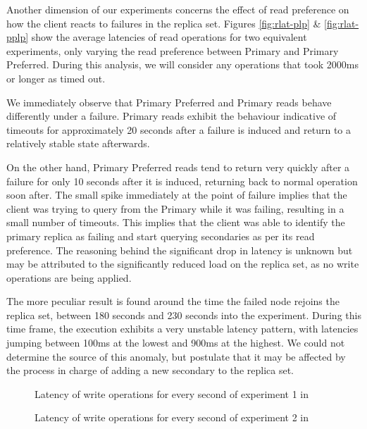 Another dimension of our experiments concerns the effect of read preference on how the client reacts to failures in the replica set. Figures \ref{fig:rlat-plp} \& \ref{fig:rlat-pplp} show the average latencies of read operations for two equivalent experiments, only varying the read preference between Primary and Primary Preferred. During this analysis, we will consider any operations that took 2000ms or longer as timed out.

We immediately observe that Primary Preferred and Primary reads behave differently under a failure. Primary reads exhibit the behaviour indicative of timeouts for approximately 20 seconds after a failure is induced and return to a relatively stable state afterwards.

On the other hand, Primary Preferred reads tend to return very quickly after a failure for only 10 seconds after it is induced, returning back to normal operation soon after. The small spike immediately at the point of failure implies that the client was trying to query from the Primary while it was failing, resulting in a small number of timeouts. This implies that the client was able to identify the primary replica as failing and start querying secondaries as per its read preference. The reasoning behind the significant drop in latency is unknown but may be attributed to the significantly reduced load on the replica set, as no write operations are being applied.

The more peculiar result is found around the time the failed node rejoins the replica set, between 180 seconds and 230 seconds into the experiment. During this time frame, the execution exhibits a very unstable latency pattern, with latencies jumping between 100ms at the lowest and 900ms at the highest. We could not determine the source of this anomaly, but postulate that it may be affected by the process in charge of adding a new secondary to the replica set.

\begin{figure}
    
    \caption{Latency of write operations for every second of experiment 1 in }
    \label{fig:lat-plp}
\end{figure}

\begin{figure}
    
    \caption{Latency of write operations for every second of experiment 2 in }
    \label{fig:lat-plj}
\end{figure}

